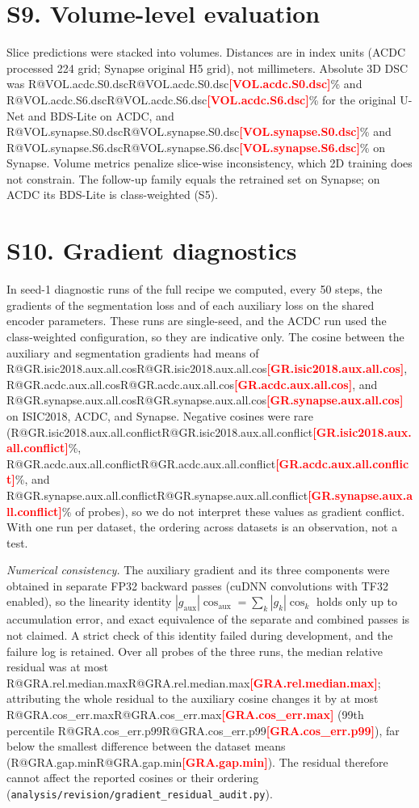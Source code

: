 \documentclass[10pt]{article}
\makeatletter
\newcommand{\R}[1]{\ifcsname R@#1\endcsname\csname R@#1\endcsname\else\textbf{\textcolor{red}{[#1]}}\fi}
\makeatother
\begin{document}
\section*{S9. Volume-level evaluation}
Slice predictions were stacked into volumes. Distances are in index units (ACDC processed 224 grid; Synapse original H5 grid), not millimeters. Absolute 3D DSC was \R{VOL.acdc.S0.dsc}\% and \R{VOL.acdc.S6.dsc}\% for the original U-Net and BDS-Lite on ACDC, and \R{VOL.synapse.S0.dsc}\% and \R{VOL.synapse.S6.dsc}\% on Synapse. Volume metrics penalize slice-wise inconsistency, which 2D training does not constrain. The follow-up family equals the retrained set on Synapse; on ACDC its BDS-Lite is class-weighted (S5).
\begin{table}[ht]\centering
\resizebox{0.8\linewidth}{!}{}
\caption{Volume-level BDS-Lite versus U-Net differences per patient (ACDC, frames averaged) or case (Synapse), oriented so that positive values favor BDS-Lite. Holm correction over the three endpoints within dataset and family.}
\end{table}

\clearpage
\section*{S10. Gradient diagnostics}
In seed-1 diagnostic runs of the full recipe we computed, every 50 steps, the gradients of the segmentation loss and of each auxiliary loss on the shared encoder parameters. These runs are single-seed, and the ACDC run used the class-weighted configuration, so they are indicative only. The cosine between the auxiliary and segmentation gradients had means of \R{GR.isic2018.aux.all.cos}, \R{GR.acdc.aux.all.cos}, and \R{GR.synapse.aux.all.cos} on ISIC2018, ACDC, and Synapse. Negative cosines were rare (\R{GR.isic2018.aux.all.conflict}\%, \R{GR.acdc.aux.all.conflict}\%, and \R{GR.synapse.aux.all.conflict}\% of probes), so we do not interpret these values as gradient conflict. With one run per dataset, the ordering across datasets is an observation, not a test.

{\small}

\emph{Numerical consistency.} The auxiliary gradient and its three components were obtained in separate FP32 backward passes (cuDNN convolutions with TF32 enabled), so the linearity identity $|g_{\mathrm{aux}}|\cos_{\mathrm{aux}}=\sum_k|g_k|\cos_k$ holds only up to accumulation error, and exact equivalence of the separate and combined passes is not claimed. A strict check of this identity failed during development, and the failure log is retained. Over all probes of the three runs, the median relative residual was at most \R{GRA.rel.median.max}; attributing the whole residual to the auxiliary cosine changes it by at most \R{GRA.cos_err.max} (99th percentile \R{GRA.cos_err.p99}), far below the smallest difference between the dataset means (\R{GRA.gap.min}). The residual therefore cannot affect the reported cosines or their ordering (\texttt{analysis/revision/gradient\_residual\_audit.py}).
\end{document}
